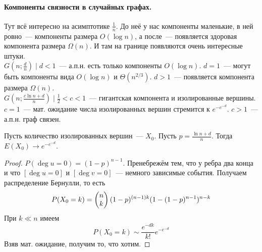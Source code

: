 \documentclass{article}
\begin{document}
    \paragraph{Компоненты связности в случайных графах.}
    \begin{remark}
        Тут всё интересно на асимптотике $\frac1n$. До неё у нас компоненты маленькие, в ней ровно~--- компоненты размера $O(\log n)$, а после~--- появляется здоровая компонента размера $\Omega(n)$. И там на границе появляются очень интересные штуки.\\
        $G(n;\frac dn)\mid d<1$~--- а.п.н. есть только компоненты $O(\log n)$. $d=1$~--- могут быть компоненты вида $O(\log n)$ и $\Theta(n^{2/3})$. $d>1$~--- появляется компонента размера $\Omega(n)$.\\
        $G(n;\frac{c\ln n+d}n)\mid \frac12<c<1$~--- гигантская компонента и изолированные вершины. $c=1$~--- мат. ожидание числа изолированных вершин стремится к $e^{-e^{-d}}$. $c>1$~--- а.п.н. граф связен.
    \end{remark}
    \begin{theorem}
        Пусть количество изолированных вершин~--- $X_0$. Пусть $p=\frac{\ln n+d}n$. Тогда $E(X_0)\rightarrow e^{-e^{-d}}$.
    \end{theorem}
    \begin{proof}
        $P(\deg u=0)=(1-p)^{n-1}$. Пренебрежём тем, что у ребра два конца и что $[\deg u=0]$ и $[\deg v=0]$~--- немного зависимые события. Получаем распределение Бернулли, то есть
        $$P(X_0=k)=\left(\begin{matrix}n\\k\end{matrix}\right)(1-p)^{(n-1)k}(1-(1-p)^{n-1})^{n-k}$$
        При $k\ll n$ имеем
        $$
        P(X_0=k)\sim\frac{e^{-dk}}{k!}e^{-e^{-d}}
        $$
        Взяв мат. ожидание, получим то, что хотим.
    \end{proof}
\end{document}
